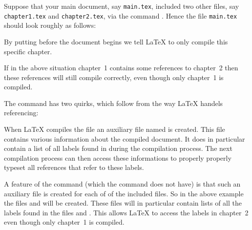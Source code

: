 Suppose that your main document, say \texttt{main.tex}, included two other files, say \texttt{chapter1.tex} and \texttt{chapter2.tex}, via the command .
Hence the file \texttt{main.tex} should look roughly as follows:
By putting  before the document begins we tell {\LaTeX} to only compile this specific chapter.
If in the above situation chapter~1 contains some references to chapter~2 then these references will still compile correctly, even though only chapter~1 is compiled.

The command  has two quirks, which follow from the way {\LaTeX} handels referencing:

When {\LaTeX} compiles the file  an auxiliary file named  is created.
This file contains various information about the compiled document.
It does in particular contain a list of all labels found in  during the compilation process.
The next compilation process can then access these informations to properly properly typeset all references that refer to these labels.

A feature of the command  (which the command  does not have) is that such an auxiliary file is created for each of of the included files.
So in the above example the files  and  will be created.
These files will in particular contain lists of all the labels found in the files  and .
This allows {\LaTeX} to access the labels in chapter~2 even though only chapter~1 is compiled.

